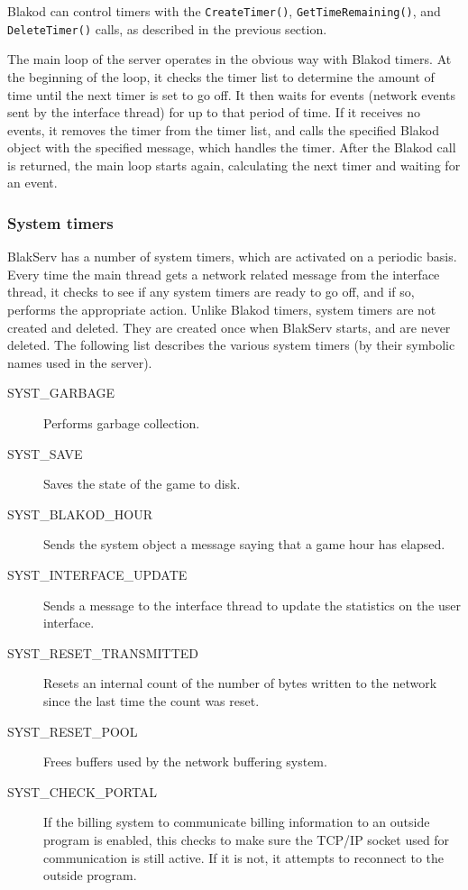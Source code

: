 Blakod can control timers with the \texttt{CreateTimer()}, \texttt{GetTimeRemaining()},
and \texttt{DeleteTimer()} calls, as described in the previous section.

The main loop of the server operates in the obvious way with Blakod timers.  At the
beginning of the loop, it checks the timer list to determine the amount of time until
the next timer is set to go off.  It then waits for events (network events sent 
by the interface thread) for up to that period of time.  If it receives no events,
it removes the timer from the timer list, and calls the specified Blakod object with
the specified message, which handles the timer.  After the Blakod call is returned,
the main loop starts again, calculating the next timer and waiting for an event.

\subsubsection{System timers}

BlakServ has a number of system timers, which are activated on a periodic basis.
Every time the main thread gets a network related message from the interface thread,
it checks to see if any system timers are ready to go off, and if so, performs 
the appropriate action.  Unlike Blakod timers, system timers are not created and
deleted.  They are created once when BlakServ starts, and are never deleted.  The
following list describes the various system timers (by their symbolic names used in
the server).

\begin{description}
\item[SYST\_GARBAGE] Performs garbage collection.
\item[SYST\_SAVE] Saves the state of the game to disk.
\item[SYST\_BLAKOD\_HOUR] Sends the system object a message saying that
a game hour has elapsed.
\item[SYST\_INTERFACE\_UPDATE] Sends a message to the interface thread to
update the statistics on the user interface.
\item[SYST\_RESET\_TRANSMITTED] Resets an internal count of the number of
bytes written to the network since the last time the count was reset.
\item[SYST\_RESET\_POOL] Frees buffers used by the network buffering system.
\item[SYST\_CHECK\_PORTAL] If the billing system to communicate billing information
to an outside program is enabled, this checks to make sure the TCP/IP socket
used for communication is still active.  If it is not, it attempts to
reconnect to the outside program.
\end{description}

